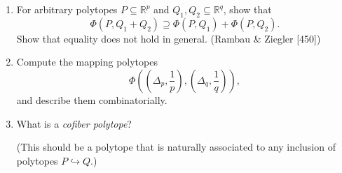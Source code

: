 \documentclass{article}
\begin{document}
\begin{enumerate}
(Hint: Start with a convex function that is linear on $P$ and constant on $Q$, and use it to ``lift'' $Q$. Then take the convex hull, and perturb all the vertices. The result is due to Goodman \& Pach [233].)

\item For arbitrary polytopes $P \subseteq \mathbb{R}^p$ and $Q_1,Q_2 \subseteq \mathbb{R}^q$, show that
\[
\Phi(P,Q_1+Q_2) \supseteq \Phi(P,Q_1) + \Phi(P,Q_2).
\]
Show that equality does not hold in general.
(Rambau \& Ziegler [450])

\item Compute the mapping polytopes
\[
\Phi\left(\left(\Delta_p,\frac{1}{p}\right),\left(\Delta_q,\frac{1}{q}\right)\right),
\]
and describe them combinatorially.

\item What is a \emph{cofiber polytope}?

(This should be a polytope that is naturally associated to any inclusion of polytopes $P \hookrightarrow Q$.)
\end{enumerate}

\pagebreak

     
\end{document}
